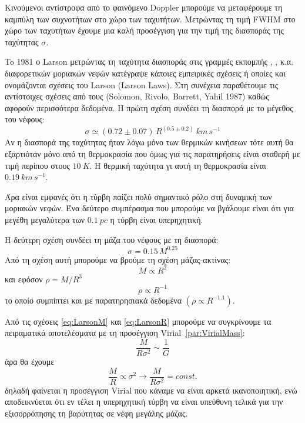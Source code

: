 \documentclass[a4paper,12pt]{memoir}
\begin{document}
Κινούμενοι αντίστροφα από το φαινόμενο Doppler μπορούμε να μεταφέρουμε τη καμπύλη των συχνοτήτων στο χώρο των ταχυτήτων. Μετρώντας τη τιμή FWHM στο χώρο των ταχυτήτων έχουμε μια καλή προσέγγιση για την τιμή της  διασποράς της ταχύτητας $\sigma$.

To 1981 ο Larson μετρώντας τη ταχύτητα διασποράς στις γραμμές εκπομπής , ,  κ.α. διαφορετικών μοριακών νεφών κατέγραψε κάποιες εμπειρικές σχέσεις ή οποίες και ονομάζονται σχέσεις του Larson (Larson Laws). Στη συνέχεια παραθέτουμε τις αντίστοιχες σχέσεις από τους (Solomon, Rivolo, Barrett, Yahil 1987) καθώς αφορούν περισσότερα δεδομένα.
Η πρώτη σχέση συνδέει τη διασπορά με το μέγεθος του νέφους:
\begin{equation}
\label{eq:LarsonR}
\sigma \simeq (0.72 \pm 0.07)\, R^{(0.5 \pm 0.2)} \ km\, s^{-1}
\end{equation} 
Αν η διασπορά της ταχύτητας ήταν λόγω μόνο των θερμικών κινήσεων τότε αυτή θα εξαρτιόταν μόνο από τη θερμοκρασία που όμως για τις παρατηρήσεις είναι σταθερή με τιμή περίπου στους $10 \ K$. Η θερμική ταχύτητα γι αυτή τη θερμοκρασία είναι $0.19\ km\, s^{-1}$.

Άρα είναι εμφανές ότι η τύρβη παίζει πολύ σημαντικό ρόλο στη δυναμική των μοριακών νεφών. Ένα δεύτερο συμπέρασμα που μπορούμε να βγάλουμε είναι ότι για μεγέθη μεγαλύτερα των $0.1 \ pc$ η τύρβη είναι υπερηχητική.

Η δεύτερη σχέση συνδέει τη μάζα του νέφους με τη διασπορά:
\begin{equation}
\label{eq:LarsonM}
\sigma = 0.15\, M^{0.25}
\end{equation}
Από τη σχέση αυτή μπορούμε να βρούμε τη σχέση μάζας-ακτίνας:
\begin{equation}
M\propto R^2
\end{equation}
και εφόσον $\rho = M/R^3$
\begin{equation}
\label{eq:Larsonrho}
\rho \propto R^{-1}
\end{equation}
το οποίο συμπίπτει και με παρατηρησιακά δεδομένα $(\rho \propto R^{-1.1})$.
\medskip

Από τις σχέσεις \ref{eq:LarsonM} και \ref{eq:LarsonR} μπορούμε να συγκρίνουμε τα πειραματικά αποτελέσματα με τη προσέγγιση Virial~\ref{par:VirialMass}: 
$$
\frac{M}{R \sigma ^2}\sim \frac{1}{G}
$$
άρα θα έχουμε
\begin{equation}
\frac{M}{R}\propto \sigma ^2 \rightarrow \frac{M}{R \sigma ^2}=const.
\end{equation}
δηλαδή φαίνεται η προσέγγιση Virial που κάναμε να είναι αρκετά ικανοποιητική, ενώ αποδεικνύεται ότι εν τέλει η υπερηχητική τύρβη να είναι υπεύθυνη τελικά για την εξισορρόπησης τη βαρύτητας σε νέφη μεγάλης μάζας. 
\end{document}
